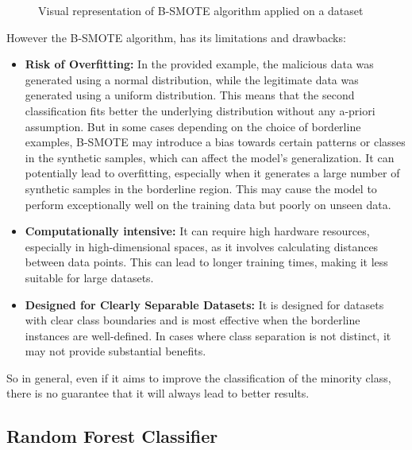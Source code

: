 \begin{figure}[H]
\begin{subfigure}{0.49\linewidth}
    \caption{}
    \label{fig:bordSMOTEApplied}
  \end{subfigure}
  \caption{Visual representation of B-SMOTE algorithm applied on a dataset}
\end{figure}

However the B-SMOTE algorithm, has its limitations and drawbacks:
\begin{itemize}
  \item \textbf{Risk of Overfitting:} In the provided example, the malicious data was generated using a normal distribution, while the legitimate data was generated using a uniform distribution.
  This means that the second classification fits better the underlying distribution without any a-priori assumption.
  But in some cases depending on the choice of borderline examples, 
  B-SMOTE may introduce a bias towards certain patterns or classes in the synthetic samples, which can affect the model's generalization.
  It can potentially lead to overfitting, especially when it generates a large number of synthetic samples in the borderline region. 
  This may cause the model to perform exceptionally well on the training data but poorly on unseen data.
  \item \textbf{Computationally intensive:} It can require high hardware resources, especially in high-dimensional spaces, as it involves calculating distances between data points. 
  This can lead to longer training times, making it less suitable for large datasets.
  \item \textbf{Designed for Clearly Separable Datasets:} It is designed for datasets with clear class boundaries and is most effective when the borderline instances are well-defined. 
  In cases where class separation is not distinct, it may not provide substantial benefits.
\end{itemize}
So in general, even if it aims to improve the classification of the minority class, there is no guarantee that it will always lead to better results.

\subsection{Random Forest Classifier}
\label{subsec:RF}


